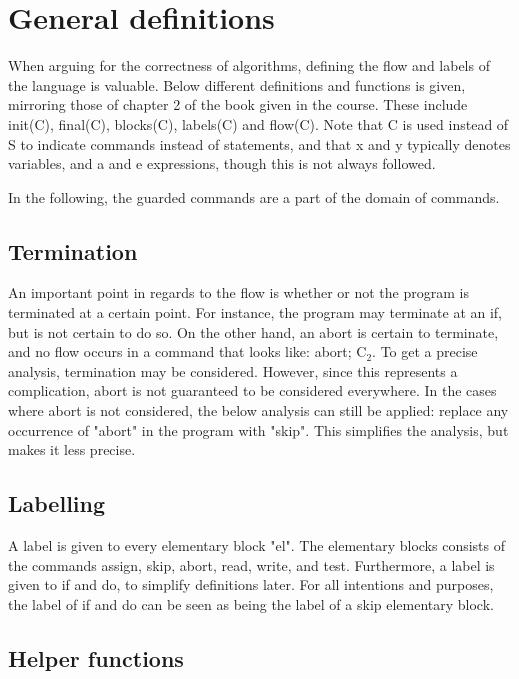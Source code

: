 
\section{General definitions}

\docpar
When arguing for the correctness of algorithms, defining the flow and labels of the language is
valuable. Below different definitions and functions is given, mirroring those of chapter 2 of the
book given in the course. These include init(C), final(C), blocks(C), labels(C) and flow(C).
Note that C is used instead of S to indicate commands instead of statements, and that
x and y typically denotes variables, and a and e expressions, though this is not always followed.

In the following, the guarded commands are a part of the domain of commands.

\subsection{Termination}

An important point in regards to the flow is whether or not the program is terminated
at a certain point. For instance, the program may terminate at an if, but is not
certain to do so. On the other hand, an abort is certain to terminate, and no flow
occurs in a command that looks like: abort; C$_2$. To get a precise analysis, termination
may be considered. However, since this represents a complication, abort is not guaranteed
to be considered everywhere. In the cases where abort is not considered, the below analysis
can still be applied: replace any occurrence of "abort" in the program with "skip".
This simplifies the analysis, but makes it less precise.

\subsection{Labelling}

A label is given to every elementary block "el". The elementary blocks consists of
the commands assign, skip, abort, read, write, and test. Furthermore, a label is given
to if and do, to simplify definitions later. For all intentions and purposes, the
label of if and do can be seen as being the label of a skip elementary block.

\subsection{Helper functions}

